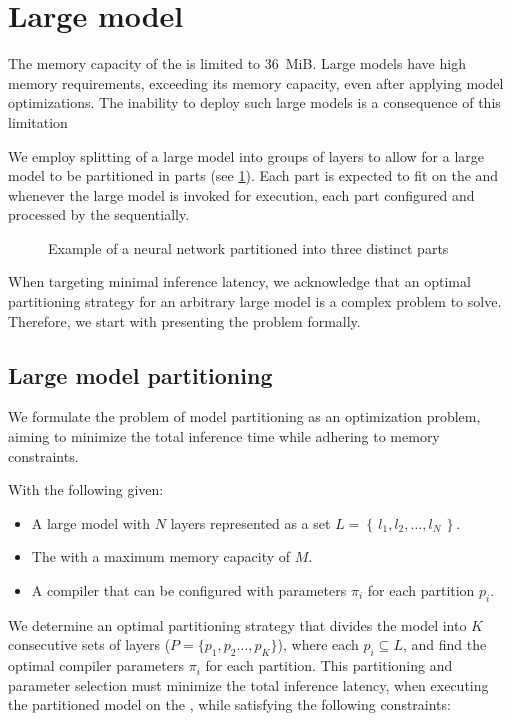 \section{Large model}
The memory capacity of the \graicore{} is limited to \SI{36}{MiB}.
Large models have high memory requirements, exceeding its memory capacity, even after applying model optimizations.
The inability to deploy such large models is a consequence of this limitation

We employ splitting of a large model into groups of layers to allow for a large model to be partitioned in parts (see \cref{fig:ann_partitioning_example}).
Each part is expected to fit on the \graicore{} and whenever the large model is invoked for execution, each part configured and processed by the \graicore{} sequentially.

\begin{figure}[hbtp]
    \centering    
    
    \caption{Example of a neural network partitioned into three distinct parts}
    \label{fig:ann_partitioning_example}
\end{figure}

When targeting minimal inference latency, we acknowledge that an optimal partitioning strategy for an arbitrary large model is a complex problem to solve.
Therefore, we start with presenting the problem formally.

\subsection{Large model partitioning}
We formulate the problem of model partitioning as an optimization problem, aiming to minimize the total inference time while adhering to memory constraints.

With the following given:
\begin{itemize}
    \item A large model with $N$ layers represented as a set $L = \left\{ \, l_1, l_2, \ldots, l_N \, \right\}$.
    \item The \graicore{} with a maximum memory capacity of $M$.
    \item A compiler that can be configured with parameters $\pi_i$ for each partition $p_i$.
\end{itemize}
We determine an optimal partitioning strategy that divides the model into $K$ consecutive sets of layers ($P = \{p_1, p_2 \ldots, p_K\}$), where each $p_i \subseteq L$, and find the optimal compiler parameters $\pi_i$ for each partition.
This partitioning and parameter selection must minimize the total inference latency, when executing the partitioned model on the \graicore{}, while satisfying the following constraints:

